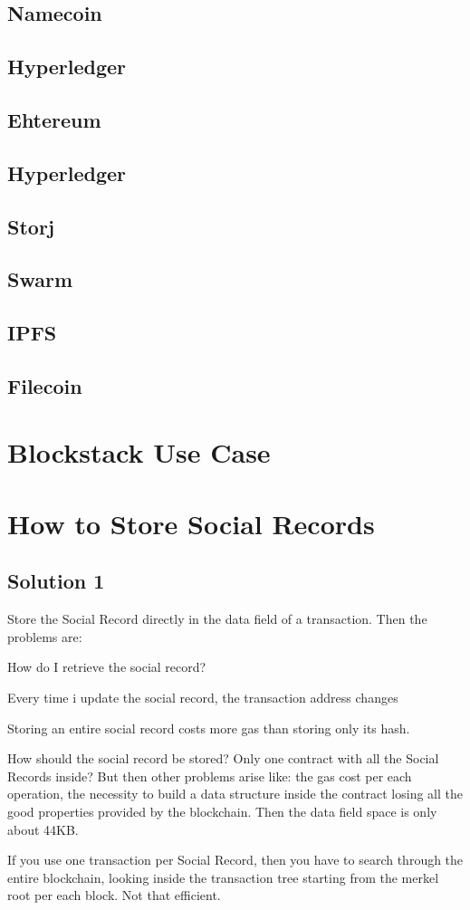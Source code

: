 \subsection*{Namecoin}
\subsection*{Hyperledger}
\subsection*{Ehtereum}
\subsection*{Hyperledger}
\subsection*{Storj}
\subsection*{Swarm}
\subsection*{IPFS}
\subsection*{Filecoin}
\section{Blockstack Use Case}
\section{How to Store Social Records}
\subsection{Solution 1}
Store the Social Record directly in the data field of a transaction. 
Then the problems are: 

\begin{list}{}{}
\item How do I retrieve the social record?
\item Every time i update the social record, the transaction address changes
\item Storing an entire social record costs more gas than storing only its hash.
\item How should the social record be stored? Only one contract with all the Social Records inside? But then other problems arise like: the gas cost per each operation, the necessity to build a data structure inside the contract losing all the good properties provided by the blockchain. Then the data field space is only about 44KB.
\item If you use one transaction per Social Record, then you have to search through the entire blockchain, looking inside the transaction tree starting from the merkel root per each block. Not that efficient. 
\end{list}

